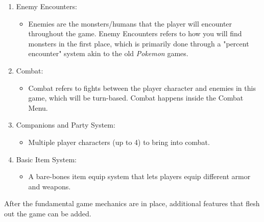 \documentclass[10pt,conference,onecolumn,compsoc]{IEEEtran}
\begin{document}
\begin{flushleft}
\begin{enumerate}
\item Enemy Encounters:
\begin{itemize}
\item Enemies are the monsters/humans that the player will encounter throughout the game. Enemy Encounters refers to how you will find monsters in the first place, which is primarily done through a "percent encounter" system akin to the old \textit{Pokemon} games.
\end{itemize}

\item Combat:
\begin{itemize}
\item Combat refers to fights between the player character and enemies in this game, which will be turn-based. Combat happens inside the Combat Menu.
\end{itemize}

\item Companions and Party System:
\begin{itemize}
\item Multiple player characters (up to 4) to bring into combat.
\end{itemize}

\item Basic Item System:
\begin{itemize}
\item A bare-bones item equip system that lets players equip different armor and weapons.
\end{itemize}

\end{enumerate}


\end{flushleft}

After the fundamental game mechanics are in place, additional features that flesh out the game can be added.
\end{document}
